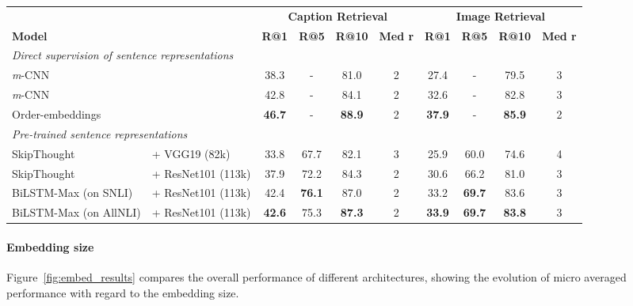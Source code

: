 \documentclass[11pt,letterpaper]{article}
\begin{document}
\begin{table*}[t]
 \begin{center}
 \begin{small}
  \begin{tabular}{l@{\,}l|cccc|cccc}
    & &
      \multicolumn{4}{c}{\bf Caption Retrieval} &
      \multicolumn{4}{c}{\bf Image Retrieval} \\
     \multicolumn{2}{l}{\bf Model} & \bf R@1 &\bf R@5 & \bf R@10 & \bf Med r & \bf R@1 & \bf R@5 & \bf R@10 & \bf Med r \\
\hline
\hline
\multicolumn{7}{l}{\it Direct supervision of sentence representations} && \\
\hline        
    \textit{m}-CNN & \cite{ma2015multimodal} & 38.3 & - & 81.0 & 2 & 27.4 & - & 79.5 & 3 \\
    \textit{m}-CNN & \cite{ma2015multimodal}& 42.8 & - & 84.1 & 2 & 32.6 & - & 82.8 & 3 \\
    Order-embeddings & \cite{vendrov2015order}& \bf 46.7 & - & \bf 88.9 & 2 & \bf 37.9 & - & \bf 85.9 & 2 \\
\hline
\hline
\multicolumn{7}{l}{\it Pre-trained sentence representations} && \\
\hline    
    SkipThought & + VGG19 (82k) & 33.8 & 67.7 & 82.1 & 3 & 25.9 & 60.0 & 74.6 & 4 \\
    SkipThought & + ResNet101 (113k)  & 37.9 & 72.2 & 84.3 & 2	& 30.6 & 66.2 & 81.0 & 3 \\
    BiLSTM-Max (on SNLI) & + ResNet101 (113k) & 42.4 & \bf 76.1 & 87.0 & 2 & 33.2 & \bf 69.7 & 83.6 & 3 \\
    BiLSTM-Max (on AllNLI) & + ResNet101 (113k) & \bf 42.6 &  75.3 & \bf 87.3 & 2 & \bf 33.9 & \bf 69.7 & \bf 83.8 & 3 \\
  \end{tabular}
  \end{small}
\caption{\label{table:coco_results} {\bf COCO retrieval results}. SkipThought is trained either using 82k training samples with VGG19 features, or with 113k samples and ResNet-101 features (our setting). We report the average results on 5 splits of 1k test images.}

\end{center}
\end{table*}

\paragraph{Embedding size}
Figure~\ref{fig:embed_results} compares the overall performance of different architectures, showing the evolution of micro averaged performance with regard to the embedding size. 
\end{document}
